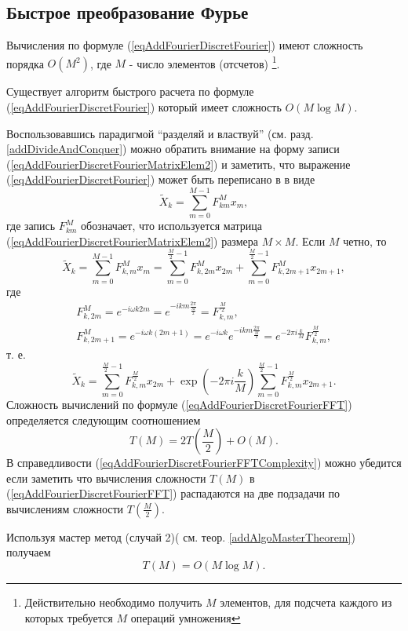 \subsection{Быстрое преобразование Фурье}
Вычисления по формуле (\ref{eqAddFourierDiscretFourier}) имеют
сложность порядка $O\left(M^2\right)$, где $M$ - число элементов (отсчетов)
\footnote{Действительно необходимо получить $M$ элементов, для
  подсчета каждого из которых требуется $M$ операций умножения}. 

Существует алгоритм быстрого расчета по формуле
(\ref{eqAddFourierDiscretFourier}) который имеет сложность
$O\left(M \log{M}\right)$.

Воспользовавшись парадигмой ``разделяй и властвуй''
(см. разд. \ref{addDivideAndConquer}) можно 
обратить внимание на форму записи
(\ref{eqAddFourierDiscretFourierMatrixElem2}) и 
заметить, что выражение
(\ref{eqAddFourierDiscretFourier}) может быть переписано в
в виде 
\begin{equation}
\tilde{X}_k = \sum^{M - 1}_{m = 0} F_{km}^{M} x_m,
\nonumber
\end{equation}
где запись $F_{km}^{M}$ обозначает, что используется матрица
(\ref{eqAddFourierDiscretFourierMatrixElem2}) размера $M\times M$.
Если $M$ четно, то 
\begin{equation}
\tilde{X}_k = \sum^{M - 1}_{m = 0} F_{k,m}^{M} x_m = 
\sum^{\frac{M}{2} - 1}_{m = 0} F_{k,2m}^M x_{2m} +
\sum^{\frac{M}{2} - 1}_{m = 0} F_{k,2m + 1}^M x_{2m + 1},
\nonumber
\end{equation}
где
\begin{eqnarray}
F_{k,2m}^{M} = e^{-i \omega k 2m} = e^{-i k m \frac{2\pi}{\frac{M}{2}}
} = F_{k,m}^{\frac{M}{2}},
\nonumber \\
F_{k,2m + 1}^{M} = e^{-i \omega k \left(2m+1\right)} = 
e^{-i \omega k}e^{-i k m \frac{2\pi}{\frac{M}{2}}} = 
e^{-2\pi i \frac{k}{M}}F_{k,m}^{\frac{M}{2}},
\nonumber
\end{eqnarray}
т. е.
\begin{equation}
\tilde{X}_k = \sum^{\frac{M}{2} - 1}_{m = 0} F_{k,m}^{\frac{M}{2}} x_{2m} +
\exp{\left(-2\pi i \frac{k}{M}\right)}
\sum^{\frac{M}{2} - 1}_{m = 0}  F_{k,m}^{\frac{M}{2}} x_{2m + 1}.
\label{eqAddFourierDiscretFourierFFT}
\end{equation}
Сложность вычислений по формуле
(\ref{eqAddFourierDiscretFourierFFT}) определяется 
следующим соотношением
\begin{equation}
T\left( M \right) = 2 T\left( \frac{M}{2} \right) + O\left( M \right).
\label{eqAddFourierDiscretFourierFFTComplexity}
\end{equation}
В справедливости
(\ref{eqAddFourierDiscretFourierFFTComplexity}) можно убедится
если заметить что вычисления сложности $T\left( M \right)$ в 
(\ref{eqAddFourierDiscretFourierFFT}) распадаются 
на две подзадачи по вычислениям сложности $T\left( \frac{M}{2}
\right)$.

Используя мастер метод (случай 2)( см. теор. \ref{addAlgoMasterTheorem})
получаем 
\begin{equation}
T\left( M \right) = O\left( M \log{M} \right).
\nonumber
\end{equation}


